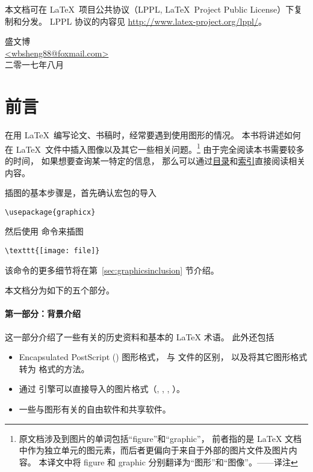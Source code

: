本文档可在 \LaTeX\ 项目公共协议（LPPL, \LaTeX\ Project Public License）下复制和分发。
LPPL 协议的内容见 \url{http://www.latex-project.org/lppl/}。

\begin{flushright}
盛文博\\
\href{mailto:wbsheng88@foxmail.com}{<wbsheng88@foxmail.com>}\\
二零一七年八月
\end{flushright}

\newpage
\section*{前言}
\label{sect:preface}

在用 \LaTeX\ 编写论文、书稿时，经常要遇到使用图形的情况。
本书将讲述如何在 \LaTeX\ 文件中插入图像以及其它一些相关问题。\footnote{
    原文档涉及到图片的单词包括“figure”和“graphic”，
    前者指的是 \LaTeX{} 文档中作为独立单元的图元素，而后者更偏向于来自于外部的图片文件及图片内容。
    本译文中将 figure 和 graphic 分别翻译为“图形”和“图像”。——译注}
由于完全阅读本书需要较多的时间，
如果想要查询某一特定的信息，
那么可以通过\hyperref[toc]{目录}和\hyperref[sec:index]{索引}直接阅读相关内容。

插图的基本步骤是，首先确认宏包的导入
\begin{lstlisting}
\usepackage{graphicx}
\end{lstlisting}
然后使用  命令来插图
\begin{lstlisting}
\texttt{[image: file]}
\end{lstlisting}
该命令的更多细节将在第~\ref{sec:graphicsinclusion} 节介绍。

本文档分为如下的五个部分。

\paragraph{第一部分：背景介绍}
这一部分介绍了一些有关的历史资料和基本的 \LaTeX{} 术语。
此外还包括
\begin{itemize}
	\item Encapsulated PostScript () 图形格式， 与  文件的区别，
	以及将其它图形格式转为  格式的方法。
	\item 通过 \pdfTeX 引擎可以直接导入的图片格式（, , , \MetaPost）。
	\item 一些与图形有关的自由软件和共享软件。
\end{itemize}

